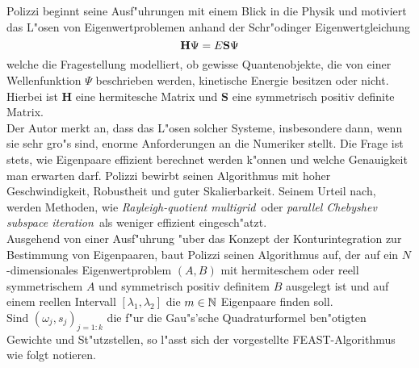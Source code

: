 \newpage

Polizzi beginnt seine Ausf"uhrungen mit einem Blick in die Physik und motiviert das L"osen von Eigenwertproblemen anhand der Schr"odinger Eigenwertgleichung
\[
\textbf{\text{H}}\Psi = E\textbf{\text{S}}\Psi
\]
welche die Fragestellung modelliert, ob gewisse Quantenobjekte, die von einer Wellenfunktion $\Psi$ beschrieben werden, kinetische Energie besitzen oder nicht. Hierbei ist \textbf{H} eine hermitesche Matrix und \textbf{S} eine symmetrisch positiv definite Matrix.\\

Der Autor merkt an, dass das L"osen solcher Systeme, insbesondere dann, wenn sie sehr gro"s sind, enorme Anforderungen an die Numeriker stellt. Die Frage ist stets, wie Eigenpaare effizient berechnet werden k"onnen und welche Genauigkeit man erwarten darf. Polizzi bewirbt seinen Algorithmus mit hoher Geschwindigkeit, Robustheit und guter Skalierbarkeit. Seinem Urteil nach, werden Methoden, wie \glqq\emph{Rayleigh-quotient multigrid}\grqq\ oder \glqq\emph{parallel Chebyshev subspace iteration}\grqq\ als weniger effizient eingesch"atzt.\\

Ausgehend von einer Ausf"uhrung "uber das Konzept der Konturintegration zur Bestimmung von Eigenpaaren, baut Polizzi seinen Algorithmus auf, der auf ein $N$-dimensionales Eigenwertproblem $(A,B)$ mit hermiteschem oder reell symmetrischem $A$ und symmetrisch positiv definitem $B$ ausgelegt ist und auf einem reellen Intervall $[\lambda_1,\lambda_2]$ die $m\in\mathbb{N}$ Eigenpaare finden soll.\\

Sind $(\omega_j, s_j)_{j=1:k}$ die f"ur die Gau"s'sche Quadraturformel ben"otigten Gewichte und St"utzstellen, so l"asst sich der vorgestellte FEAST-Algorithmus wie folgt notieren.


